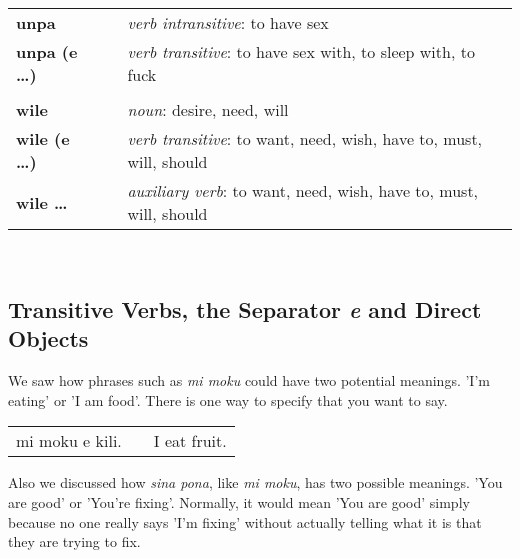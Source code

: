 \begin{supertabular}{p{2,5cm}|ll}
    \textbf{unpa}             &  & \textit{verb intransitive}: to have sex                                                 \\ %
    \textbf{unpa (e \dots)}   &  & \textit{verb transitive}: to have sex with, to sleep with, to fuck                      \\ %
                              &  &                                                                                         \\ %
    \textbf{wile}             &  & \textit{noun}: desire, need, will                                                       \\ %
    \textbf{wile (e \dots)}   &  & \textit{verb transitive}: to want, need, wish, have to, must, will, should              \\ %
    \textbf{wile \dots}       &  & \textit{auxiliary verb}: to want, need, wish, have to, must, will, should               \\ %
\end{supertabular} \\
%
\newpage
\subsection*{Transitive Verbs, the Separator \textit{e} and Direct Objects}
%
%
We saw how phrases such as \textit{mi moku} could have two potential meanings.
'I'm eating' or 'I am food'.
There is one way to specify that you want to say.

\begin{supertabular}{p{5,5cm}|ll}
    mi moku e kili. &  & I eat fruit. \\
\end{supertabular}

Also we discussed how \textit{sina pona}, like \textit{mi moku}, has two possible meanings.
'You are good' or 'You're fixing'.
Normally, it would mean 'You are good' simply because no one really says 'I'm fixing' without actually telling what it is that they are trying to fix.

